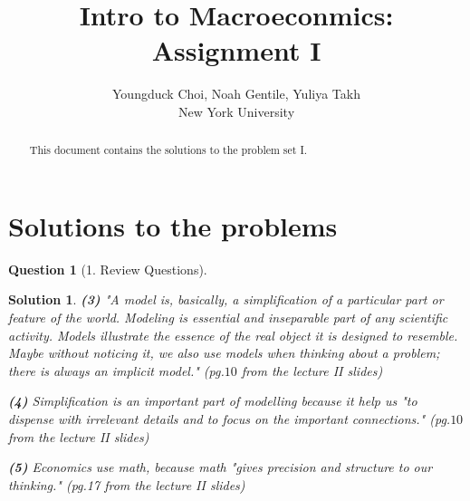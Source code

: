 \documentclass{article} %
\title{Intro to Macroeconmics: Assignment I}
\author{
Youngduck Choi, Noah Gentile, Yuliya Takh \\
New York University \\
}
\theoremstyle{quest}
\newtheorem*{question}{Question}
\newtheorem*{solution}{Solution}
\begin{document}
\maketitle

\begin{abstract}
This document contains the solutions to the problem set I.
\end{abstract}

\section{Solutions to the problems}

\begin{question}[1. Review Questions]
\end{question}
\begin{solution}

\textbf{(3)}
"A model is, basically, a simplification of a particular part or feature of the world. 
Modeling is essential and inseparable part of any scientific activity. Models illustrate
the essence of the real object it is designed to resemble. Maybe without noticing it, we also
use models when thinking about a problem; there is always an implicit model." 
(pg.$10$ from the lecture II slides) 

\smallskip

\textbf{(4)}
Simplification is an important part of modelling because it help us
"to dispense with irrelevant details and to focus on the important connections." 
(pg.$10$ from the lecture II slides)
\smallskip

\textbf{(5)}
Economics use math, because math "gives precision and structure to our thinking." (pg.17 
from the lecture II slides)
\end{solution}

\bigskip
\end{document}
